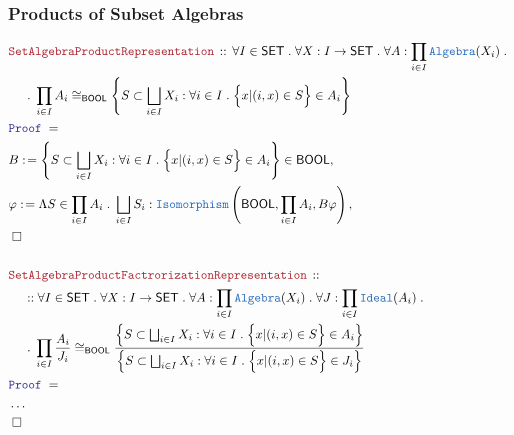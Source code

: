 \documentclass[12pt]{scrartcl}
\newcommand{\TYPE}[1]{\textcolor{NavyBlue}{\mathtt{#1}}}
\newcommand{\LOGIC}[1]{\textcolor{Blue}{\mathtt{#1}}}
\newcommand{\THM}[1]{\textcolor{Maroon}{\mathtt{#1}}}
\renewcommand{\.}{\; . \;}
\newcommand{\de}{: \kern 0.1pc =}
\newcommand{\Theorem}[2]{& \THM{#1} \, :: \, #2 \\ & \Proof = \\ }
\newcommand{\NewLine}{\\ & \kern 1pc}
\newcommand{\Page}[1]{ \begin{align*} #1 \end{align*}   }
\newcommand{\NoProof}{ & \ldots \\ \EndProof}
\newcommand{\Say}[3]{& #1 \de #2 : #3, \\}
\newcommand{\SayIn}[3]{& #1 \de #2 \in #3, \\}
\newcommand{\QED}{\; \square}
\newcommand{\EndProof}{& \QED \\}
\newcommand{\Proof}{\LOGIC{Proof} \; }
\newcommand{\Ideal}{\TYPE{Ideal}}
\newcommand{\SET}{\mathsf{SET}}
\newcommand{\Alg}{\TYPE{Algebra}}
\newcommand{\BOOL}{\mathsf{BOOL}}
\begin{document}
\subsubsection{Products of Subset Algebras}
\Page{
	\Theorem{SetAlgebraProductRepresentation}
	{
		\forall I \in \SET \.
		\forall X : I \to \SET \.
		\forall A : \prod_{i \in I} \Alg(X_i) \.
		\NewLine \.
		\prod_{i \in I} A_i \cong_\BOOL 
		\left\{
					S \subset \bigsqcup_{i \in I} X_i : 
					\forall i \in I \.
					\Big\{ x | (i,x) \in S   \Big\} \in A_i
		\right\}		
	}
	\SayIn{B}{
		\left\{
					S \subset \bigsqcup_{i \in I} X_i : 
					\forall i \in I \.
					\Big\{ x | (i,x) \in S   \Big\} \in A_i
		\right\}	
	}{\BOOL}
	\Say{\varphi}{\Lambda S \in \prod_{i \in I} A_i \. \bigsqcup_{i \in I} S_i }
	{\TYPE{Isomorphism}\left(\BOOL,\prod_{i\in I} A_i,B \varphi \right)}
	\EndProof
	\\
	\Theorem{SetAlgebraProductFactrorizationRepresentation}
	{
		\NewLine ::		
		\forall I \in \SET \.
		\forall X : I \to \SET \.
		\forall A : \prod_{i \in I} \Alg(X_i) \.
		\forall J : \prod_{i \in I} \Ideal(A_i) \.
		\NewLine \.
		\prod_{i \in I} \frac{A_i}{J_i} \cong_\BOOL
		\frac{ 
		\left\{
					S \subset \bigsqcup_{i \in I} X_i : 
					\forall i \in I \.
					\Big\{ x | (i,x) \in S   \Big\} \in A_i
		\right\} }
		{
			\left\{
					S \subset \bigsqcup_{i \in I} X_i : 
					\forall i \in I \.
					\Big\{ x | (i,x) \in S   \Big\} \in J_i
			\right\}
		}		
	}
	\NoProof
}
\newpage
\end{document}
